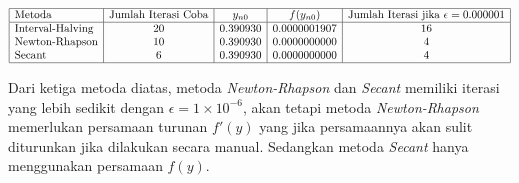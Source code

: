 \documentclass[11pt]{article}
\begin{document}
\[\begin{array}{|l|c|c|c|c|}
\hline
\text{Metoda} & \text{Jumlah Iterasi Coba} & y_{n0} & f(y_{n0}) & \text{Jumlah Iterasi jika } \epsilon = 0.000001 \\
\hline
\text{Interval-Halving} & 20 & 0.390930 & 0.0000001907 & 16 \\
\text{Newton-Rhapson} & 10 & 0.390930 & 0.0000000000 & 4 \\
\text{Secant} & 6 & 0.390930 & 0.0000000000 & 4 \\\hline
\end{array}
\]

Dari ketiga metoda diatas, metoda \emph{Newton-Rhapson} dan
\emph{Secant} memiliki iterasi yang lebih sedikit dengan
\(\epsilon = 1\times10^{-6}\), akan tetapi metoda \emph{Newton-Rhapson}
memerlukan persamaan turunan \(f'(y)\) yang jika persamaannya akan sulit
diturunkan jika dilakukan secara manual. Sedangkan metoda \emph{Secant}
hanya menggunakan persamaan \(f(y)\).


    
    
    
    
\end{document}
